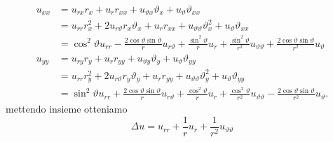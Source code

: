 \begin{equation*}
    \begin{aligned}
        u_{xx} & =u_{rx} r_{x} +u_{r} r_{xx} +u_{\vartheta x} \vartheta _{x} +u_{\vartheta } \vartheta _{xx}                                                                                                                                                            \\
               & =u_{rr} r^{2}_{x} +2u_{r\vartheta } r_{x} \vartheta _{x} +u_{r} r_{xx} +u_{\vartheta \vartheta } \vartheta ^{2}_{x} +u_{\vartheta } \vartheta _{xx}                                                                                                    \\
               & =\cos^{2} \vartheta u_{rr} -\frac{2\cos \vartheta \sin \vartheta }{r} u_{r\vartheta } +\frac{\sin^{2} \vartheta }{r} u_{r} +\frac{\sin^{2} \vartheta }{r^{2}} u_{\vartheta \vartheta } +\frac{2\cos \vartheta \sin \vartheta }{r^{2}} u_{\vartheta }   \\
        u_{yy} & =u_{ry} r_{y} +u_{r} r_{yy} +u_{\vartheta y} \vartheta _{y} +u_{\vartheta } \vartheta _{yy}                                                                                                                                                            \\
               & =u_{rr} r^{2}_{y} +2u_{r\vartheta } r_{y} \vartheta _{y} +u_{r} r_{yy} +u_{\vartheta \vartheta } \vartheta ^{2}_{y} +u_{\vartheta } \vartheta _{yy}                                                                                                    \\
               & =\sin^{2} \vartheta u_{rr} +\frac{2\cos \vartheta \sin \vartheta }{r} u_{r\vartheta } +\frac{\cos^{2} \vartheta }{r} u_{r} +\frac{\cos^{2} \vartheta }{r^{2}} u_{\vartheta \vartheta } -\frac{2\cos \vartheta \sin \vartheta }{r^{2}} u_{\vartheta } .
    \end{aligned}
\end{equation*}
mettendo insieme otteniamo
\begin{equation*}
    \Delta u=u_{rr} +\frac{1}{r} u_{r} +\frac{1}{r^{2}} u_{\vartheta \vartheta }
\end{equation*}
